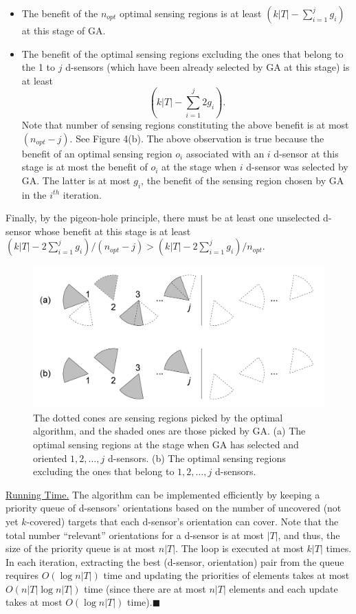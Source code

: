 \documentclass[conference]{IEEEtran}
\theoremstyle{definition}
\newtheorem*{NP-Hardness of Approximating the SODkC Problem}{NP-Hardness of Approximating the SODkC Problem}
\newtheorem*{Greedy Algorithm (GA)}{Greedy Algorithm (GA)}
\newtheorem*{GA on the Running Example}{GA on the Running Example}
\newtheorem*{Performance Guarantee of GA}{Performance Guarantee of GA}
\begin{document}
\begin{itemize}
    \item The benefit of the $n_{opt}$ optimal sensing regions is at least $(k|T| - \sum_{i=1}^j g_i)$ at this stage of GA.
    \item The benefit of the optimal sensing regions excluding the ones that belong to the 1 to $j$ d-sensors (which have been already selected by GA at this stage) is at least
    \begin{equation*}
        (k|T| - \sum_{i=1}^j 2g_i).
    \end{equation*}
    Note that number of sensing regions constituting the above benefit is at most $(n_{opt} - j)$. See Figure 4(b). The above observation is true because the benefit of an optimal sensing region $o_i$ associated with an $i$ d-sensor at this stage is at most the benefit of $o_i$ at the stage when $i$ d-sensor was selected by GA. The latter is at most $g_i$, the benefit of the sensing region chosen by GA in the $i^{th}$ iteration.
\end{itemize}
Finally, by the pigeon-hole principle, there must be at least one unselected d-sensor whose benefit at this stage is at least $(k|T| - 2\sum_{i=1}^jg_i)/(n_{opt} - j) > (k|T| - 2\sum_{i=1}^j g_i)/n_{opt}$.

\begin{figure}
    \centering
    \includegraphics[width=0.8\columnwidth]{4.png}
    \caption{The dotted cones are sensing regions picked by the optimal algorithm, and the shaded ones are those picked by GA. (a) The optimal sensing regions at the stage when GA has selected and oriented $1, 2,\dots,j$ d-sensors. (b) The optimal sensing regions
excluding the ones that belong to $1, 2,\dots,j$ d-sensors.
}
    \label{fig:enter-label}
\end{figure}

\noindent\underline{Running Time.} The algorithm can be implemented efficiently by keeping a priority queue of d-sensors’ orientations based on the number of uncovered (not yet $k$-covered) targets that each d-sensor’s orientation can cover. Note that the total number “relevant” orientations for a d-sensor is at most $|T|$, and thus, the size of the priority queue is at most $n|T|$. The loop is executed at most $k|T|$ times. In each iteration, extracting the best (d-sensor, orientation) pair from the queue requires $O(\log n|T|)$ time and updating the priorities of elements takes at most $O(n|T| \log n|T|)$ time (since there are at most $n|T|$ elements and each update takes at most $O(\log n|T|)$ time).\hfill $\blacksquare$
\end{document}
